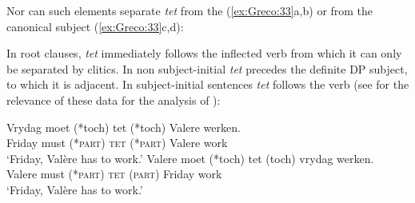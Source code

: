 \documentclass[output=paper]{LSP/langsci}
\begin{document}
\ea%
    \label{ex:Greco:32}
    \z
\z

Nor can such elements separate \textit{tet} from the  (\ref{ex:Greco:33}a,b) or from the canonical subject (\ref{ex:Greco:33}c,d):

\ea%
    \label{ex:Greco:33}
	\z
\z

In root clauses, \textit{tet} immediately follows the inflected verb from which it can only be separated by clitics. In non subject-initial   \textit{tet} precedes the definite DP subject, to which it is adjacent. In subject-initial  sentences  \textit{tet} follows the  verb (see \citealt{CraenenbroeckEtAl2007} for the relevance of these data for the analysis of ):

\ea%
    \label{ex:Greco:34}
    \ea \label{ex:Greco:34a} \gll Vrydag   moet   (*toch)   tet   (*toch) Valere werken.\\
    	    Friday   must   (*\textsc{part})   \textsc{tet}  (*\textsc{part}) Valere work\\
            \glt `Friday, Valère has to work.'
	\ex \label{ex:Greco:34b} \gll Valere   moet   (*toch)   tet   (toch)   vrydag werken.\\
		     Valere   must   (*\textsc{part})   \textsc{tet}  (\textsc{part}) Friday work\\
	\glt `Friday, Valère has to work.'
    \z
\z
\end{document}
